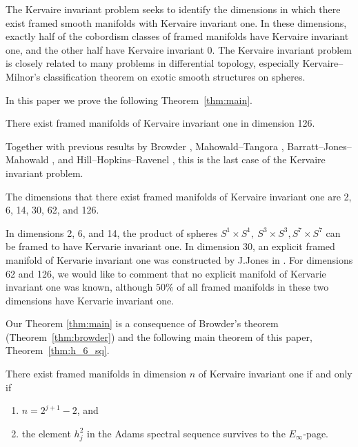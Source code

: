 \documentclass{amsart}
\numberwithin{equation}{section}
\begin{document}
The Kervaire invariant problem seeks to identify the dimensions in which there exist  framed smooth manifolds with Kervaire invariant one. In these dimensions, exactly half of the cobordism classes of framed manifolds have Kervaire invariant one, and the other half have Kervaire invariant 0. The Kervaire invariant problem is closely related to many problems in differential topology, especially Kervaire--Milnor's classification theorem \cite{KervaireMilnor} on exotic smooth structures on spheres. 


In this paper we prove the following Theorem~\ref{thm:main}.

\begin{theorem} \label{thm:main}
    There exist framed manifolds of Kervaire invariant one in dimension 126.
\end{theorem}

Together with previous results by Browder \cite{Browder}, Mahowald--Tangora \cite{MahowaldTangora}, Barratt--Jones--Mahowald \cite{BJMtheta5}, and Hill--Hopkins--Ravenel \cite{HHR}, this is the last case of the Kervaire invariant problem.

\begin{corollary}
  The dimensions that there exist framed manifolds of Kervaire invariant one are 2, 6, 14, 30, 62, and 126.  
\end{corollary}

In dimensions 2, 6, and 14, the product of spheres $S^1 \times S^1, \ S^3 \times S^3, S^7 \times S^7$ can be framed to have Kervarie invariant one.
In dimension 30, an explicit framed manifold of Kervarie invariant one was constructed by J.Jones in \cite{Jones30}. For dimensions 62 and 126, we would like to comment that no explicit manifold of Kervarie invariant one was known, although $50\%$ of all framed manifolds in these two dimensions have Kervarie invariant one.

Our Theorem \ref{thm:main} is a consequence of Browder's theorem (Theorem~\ref{thm:browder}) and the following main theorem of this paper, Theorem~\ref{thm:h_6_sq}. 

\begin{theorem} \label{thm:browder}
   There exist framed manifolds in dimension $n$ of Kervaire invariant one if and only if
   \begin{enumerate}
       \item $n=2^{j+1}-2$, and
       \item the element $h_j^2$ in the Adams spectral sequence survives to the $E_\infty$-page.
   \end{enumerate}
\end{theorem}
\end{document}
